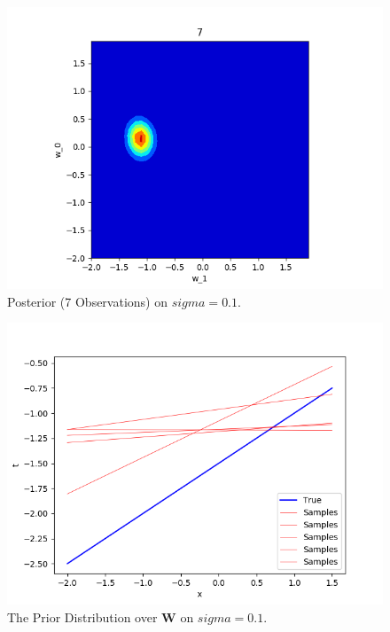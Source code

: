 \documentclass[12pt,letterpaper]{article}
\begin{document}
\begin{figure}[htb]
\centering
\includegraphics[scale =0.3]{Q9_sigma_01_1.png} 
\caption{Posterior (7 Observations) on $sigma = 0.1$.}
\end{figure}
\begin{figure}[htb]
\centering
\includegraphics[scale =0.3]{Q9_sigma_01_2.png} 
\caption{The Prior Distribution over \textbf{W} on $sigma = 0.1$.}
\end{figure}
\end{document}
